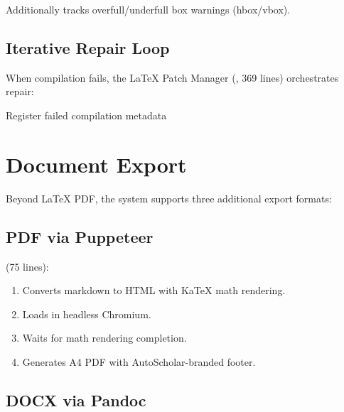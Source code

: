 Additionally tracks overfull/underfull box warnings (hbox/vbox).

\subsection{Iterative Repair Loop}

When compilation fails, the \LaTeX{} Patch Manager (, 369 lines) orchestrates repair:

\begin{algorithm}[H]
\caption{\LaTeX{} Iterative Repair}
\label{alg:latex-repair}
\SetAlgoLined
{}

Register failed compilation metadata\;
\;
\end{algorithm}

\section{Document Export}
\label{sec:paper:export}

Beyond \LaTeX{} PDF, the system supports three additional export formats:

\subsection{PDF via Puppeteer}

 (75 lines):
\begin{enumerate}
  \item Converts markdown to HTML with KaTeX math rendering.
  \item Loads in headless Chromium.
  \item Waits for math rendering completion.
  \item Generates A4 PDF with AutoScholar-branded footer.
\end{enumerate}

\subsection{DOCX via Pandoc}

